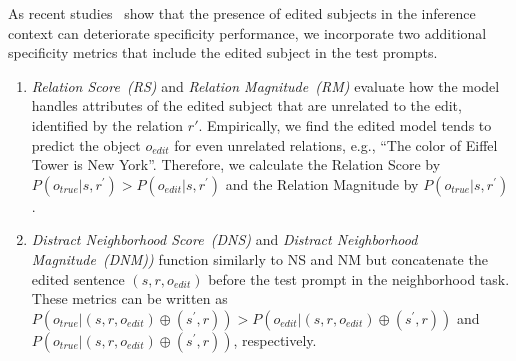 As recent studies~\citep{hoelscher2023detecting, yao2023editing} show that the presence of edited subjects in the inference context can deteriorate specificity performance, we incorporate two additional specificity metrics that include the edited subject in the test prompts.

\begin{enumerate}[label=\arabic*), itemsep=2pt, wide=0pt, leftmargin=*, after=\strut]
    \item \textit{Relation Score~(RS)} and \textit{Relation Magnitude~(RM)} evaluate how the model handles attributes of the edited subject that are unrelated to the edit, identified by the relation $r'$.
    Empirically, we find the edited model tends to predict the object $o_{edit}$ for even unrelated relations, e.g., ``The color of Eiffel Tower is New York''.
    Therefore, we calculate the Relation Score by $P(o_{true}|s,r^\prime) > P(o_{edit}|s,r^\prime)$ and the Relation Magnitude by $P(o_{true}|s,r^\prime)$.

    \item \textit{Distract Neighborhood Score~(DNS)} and \textit{Distract Neighborhood Magnitude~(DNM))} function similarly to NS and NM but concatenate the edited sentence $(s, r, o_{edit})$ before the test prompt in the neighborhood task. 
    These metrics can be written as \(P(o_{true}|(s,r,o_{edit}) \oplus (s^\prime,r)) > P(o_{edit}|(s,r,o_{edit}) \oplus (s^\prime,r))\) and \(P(o_{true}|(s,r,o_{edit}) \oplus (s^\prime,r))\), respectively.
\end{enumerate}


